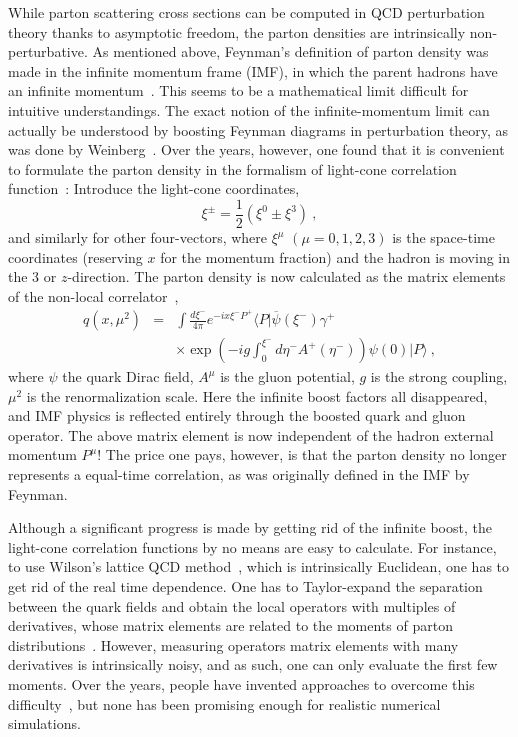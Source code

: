 \documentclass[aps,prd,preprint,tightenlines,superscriptaddress]{revtex4}
\begin{document}
While parton scattering cross sections can be computed in QCD perturbation theory
thanks to asymptotic freedom, the parton densities are intrinsically non-perturbative. 
As mentioned above, Feynman's definition of parton density was made in the infinite momentum frame (IMF), in which 
the parent hadrons have an infinite momentum~\cite{Feynman:1969ej}. This seems to be a mathematical limit difficult
for intuitive understandings. The exact notion of the infinite-momentum limit can actually be understood by
boosting Feynman diagrams in perturbation theory, as was done by Weinberg~\cite{Weinberg:1966jm}. Over the years,
however, one found that it is convenient to formulate the parton
density in the formalism of light-cone correlation function~\cite{Drell:1969ca}: Introduce the light-cone
coordinates,
\begin{equation}
      \xi^\pm = \frac{1}{2}(\xi^0\pm \xi^3) \ ,
\end{equation}
and similarly for other four-vectors, where $\xi^\mu$ $(\mu=0,1,2,3)$ is the space-time coordinates 
(reserving $x$ for the momentum fraction) and the hadron
is moving in the 3 or $z$-direction. The parton density is now calculated as the matrix elements
of the non-local correlator~\cite{Collins:1981uw},
\begin{eqnarray}
   q(x, \mu^2) &=& \int \frac{d\xi^-}{4\pi} e^{-ix\xi^-P^+}  \langle P|\overline{\psi}(\xi^-)
   \gamma^+ \\
   && \times \exp\left(-ig\int^{\xi^-}_0 d\eta^- A^+(\eta^-) \right)\psi(0) |P\rangle \nonumber \ ,
\end{eqnarray}
where $\psi$ the quark Dirac field, $A^\mu$ is the gluon potential,
$g$ is the strong coupling, $\mu^2$ is the renormalization scale.
Here the infinite boost factors all disappeared, and IMF physics is reflected entirely through
the boosted quark and gluon operator. The above matrix element is now independent of the hadron
external momentum $P^\mu$! The price one pays,
however, is that the parton density no longer represents a equal-time correlation, as 
was originally defined in the IMF by Feynman.

Although a significant progress is made by getting rid of the infinite boost, the
light-cone correlation functions by no means are easy to calculate. For instance, to use Wilson's
lattice QCD method~\cite{Wilson:1974sk}, which is intrinsically Euclidean, one has to get rid of the real
time dependence. One has to
Taylor-expand the separation between the quark fields and obtain the local operators with multiples
of derivatives, whose matrix elements are related to the moments of parton distributions~\cite{negele}. However, measuring
operators matrix elements with many derivatives is intrinsically noisy, and as such, one can only evaluate
the first few moments. Over the years, people have invented approaches to overcome
this difficulty~\cite{Aglietti:1998mz,Liu:1999ak,Detmold:2005gg}, but
none has been promising enough for realistic numerical simulations.
\end{document}
